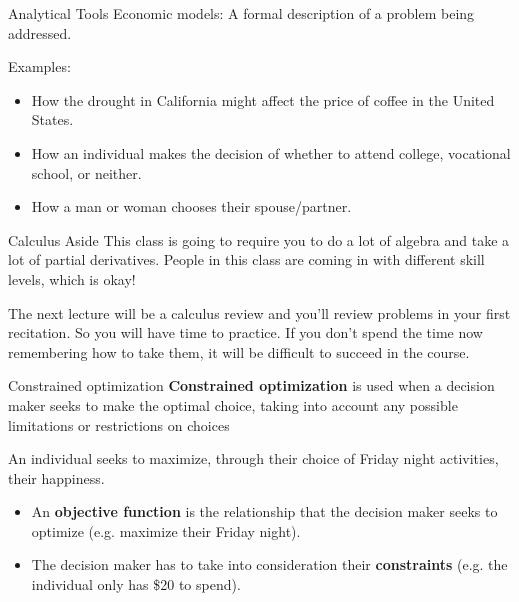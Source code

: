 \documentclass{beamer}
\begin{document}
\begin{frame}{Analytical Tools}
  Economic models: A formal description of a problem being addressed.

  \bigskip
  Examples:
  \begin{itemize}
    \item How the drought in California might affect the price of coffee in the United States.
    \item How an individual makes the decision of whether to attend college, vocational school, or neither.
    \item How a man or woman chooses their spouse/partner.
  \end{itemize}
\end{frame}

\begin{frame}{Calculus Aside}
  This class is going to require you to do a lot of algebra and take a lot of partial derivatives. People in this class are coming in with different skill levels, which is okay!

  \bigskip
  The next lecture will be a calculus review and you'll review problems in your first recitation.  So you will have time to practice.  If you don't spend the time now remembering how to take them, it will be difficult to succeed in the course.
\end{frame}

\begin{frame}{Constrained optimization}
  \textbf{Constrained optimization} is used when a decision maker seeks to make the optimal choice, taking into account any possible limitations or restrictions on choices

  \bigskip
  
  \bigskip
  An individual seeks to maximize, through their choice of Friday night activities, their happiness.

  \begin{itemize}
    \item An \textbf{objective function} is the relationship that the decision maker seeks to optimize (e.g. maximize their Friday night).
    \item  The decision maker has to take into consideration their \textbf{constraints} (e.g. the individual only has \$20 to spend).
  \end{itemize}
\end{frame}
\end{document}
